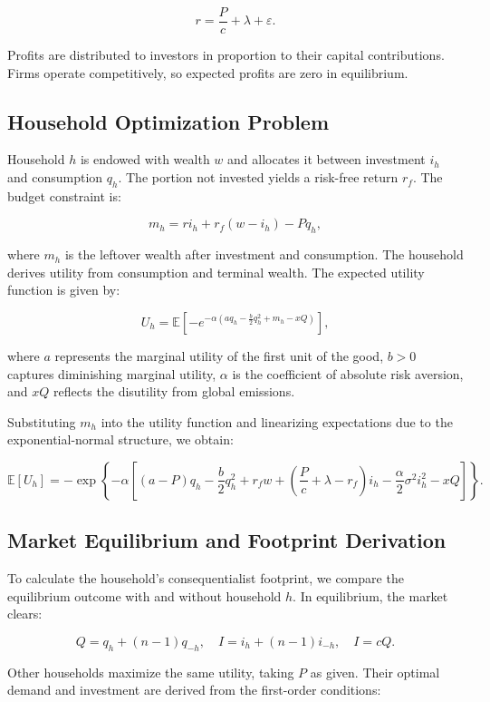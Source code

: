 \documentclass[12pt,a4paper]{article}
\begin{document}
\[
r = \frac{P}{c} + \lambda + \varepsilon.
\]

Profits are distributed to investors in proportion to their capital contributions. Firms operate competitively, so expected profits are zero in equilibrium.

\subsection*{Household Optimization Problem}

Household $h$ is endowed with wealth $w$ and allocates it between investment $i_h$ and consumption $q_h$. The portion not invested yields a risk-free return $r_f$. The budget constraint is:

\[
m_h = r i_h + r_f(w - i_h) - P q_h,
\]

where $m_h$ is the leftover wealth after investment and consumption. The household derives utility from consumption and terminal wealth. The expected utility function is given by:

\[
U_h = \mathbb{E} \left[ -e^{-\alpha \left( a q_h - \frac{b}{2}q_h^2 + m_h - xQ \right)} \right],
\]

where $a$ represents the marginal utility of the first unit of the good, $b > 0$ captures diminishing marginal utility, $\alpha$ is the coefficient of absolute risk aversion, and $xQ$ reflects the disutility from global emissions.

Substituting $m_h$ into the utility function and linearizing expectations due to the exponential-normal structure, we obtain:

\[
\mathbb{E}[U_h] = -\exp \left\{ -\alpha \left[ (a - P)q_h - \frac{b}{2}q_h^2 + r_f w + \left( \frac{P}{c} + \lambda - r_f \right)i_h - \frac{\alpha}{2} \sigma^2 i_h^2 - xQ \right] \right\}.
\]

\subsection*{Market Equilibrium and Footprint Derivation}

To calculate the household's consequentialist footprint, we compare the equilibrium outcome with and without household $h$. In equilibrium, the market clears:

\[
Q = q_h + (n - 1) q_{-h}, \quad I = i_h + (n - 1) i_{-h}, \quad I = cQ.
\]

Other households maximize the same utility, taking $P$ as given. Their optimal demand and investment are derived from the first-order conditions:
\end{document}
